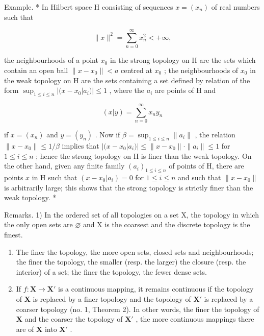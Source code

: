 Example. * In Hilbert space H consisting of sequences \(x = (x_n)\) of real numbers such that

\[
\| x \| ^ {2} = \sum_ {n = 0} ^ {\infty} x _ {n} ^ {2} <   + \infty ,
\]

the neighbourhoods of a point \(x_0\) in the strong topology on H are the sets which contain an open ball \(\|x - x_0\| < a\) centred at \(x_0\) ; the neighbourhoods of \(x_0\) in the weak topology on H are the sets containing a set defined by relation of the form \(\sup_{1 \leqslant i \leqslant n} |(x - x_0|a_i)| \leqslant 1\) , where the \(a_i\) are points of H and

\[
(x | y) = \sum_ {n = 0} ^ {\infty} x _ {n} y _ {n}
\]

if \(x = (x_n)\) and \(y = (y_n)\) . Now if \(\beta = \sup_{1 \leqslant i \leqslant n} \|a_i\|\) , the relation \(\|x - x_0\| \leqslant 1/\beta\) implies that \(|(x - x_0|a_i)| \leqslant \|x - x_0\| \cdot \|a_i\| \leqslant 1\) for \(1 \leqslant i \leqslant n\) ; hence the strong topology on H is finer than the weak topology. On the other hand, given any finite family \((a_i)_{1 \leqslant i \leqslant n}\) of points of H, there are points \(x\) in H such that \((x - x_0|a_i) = 0\) for \(1 \leqslant i \leqslant n\) and such that \(\|x - x_0\|\) is arbitrarily large; this shows that the strong topology is strictly finer than the weak topology. *

Remarks. 1) In the ordered set of all topologies on a set X, the topology in which the only open sets are \(\varnothing\) and X is the coarsest and the discrete topology is the finest.

\begin{enumerate}
\def\labelenumi{\arabic{enumi})}
\setcounter{enumi}{1}
\item
  The finer the topology, the more open sets, closed sets and neighbourhoods; the finer the topology, the smaller (resp. the larger) the closure (resp. the interior) of a set; the finer the topology, the fewer dense sets.
\item
  If \(f: \mathbf{X} \to \mathbf{X}'\) is a continuous mapping, it remains continuous if the topology of \(\mathbf{X}\) is replaced by a finer topology and the topology of \(\mathbf{X}'\) is replaced by a coarser topology (no. 1, Theorem 2). In other words, the finer the topology of \(\mathbf{X}\) and the coarser the topology of \(\mathbf{X}'\) , the more continuous mappings there are of \(\mathbf{X}\) into \(\mathbf{X}'\) .
\end{enumerate}

